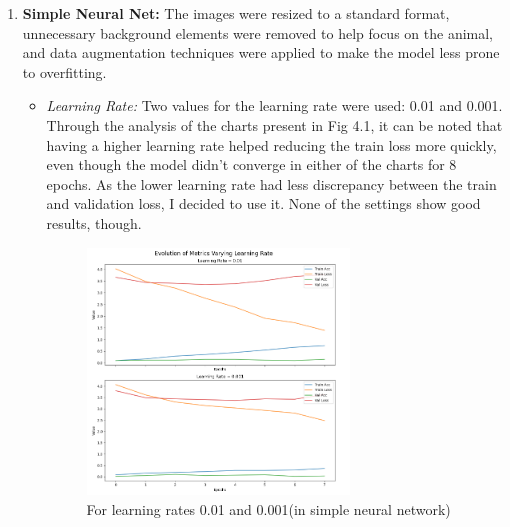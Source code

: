 \begin{enumerate}
    \item \textbf{Simple Neural Net:} The images were resized to a standard format, unnecessary background elements were removed to help focus on the animal, and data augmentation techniques were applied to make the model less prone to overfitting.
    \begin{itemize}
    \item \textit{Learning Rate:} Two values for the learning rate were used: 0.01 and 0.001. Through the analysis of the charts present in Fig 4.1, it can be noted that having a higher learning rate helped reducing the train loss more quickly, even though the model didn't converge in either of the charts for 8 epochs. As the lower learning rate had less discrepancy between the train and validation loss, I decided to use it. None of the settings show good results, though.\\
   \begin{figure}[h]
    \centering
    \includegraphics[width=0.7\textwidth]{figures/ssn_lr.png}
    \caption{For learning rates 0.01 and 0.001(in simple neural network)}
    \label{fig:example_images}
\end{figure}




\end{itemize}
\end{enumerate}
